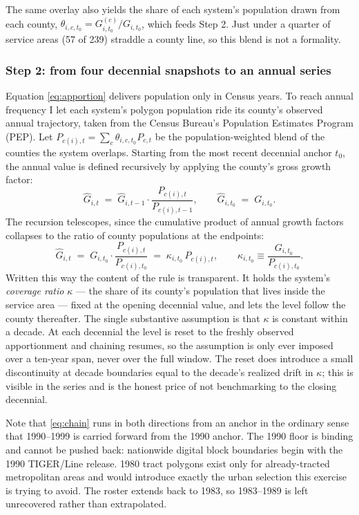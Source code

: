 The same overlay also yields the share of each system's population drawn from
each county,
$\theta_{i,c,t_0} = G_{i,t_0}^{(c)} / G_{i,t_0}$, which feeds Step 2. Just under a
quarter of service areas (57 of 239) straddle a county line, so this blend is not
a formality.

\subsubsection{Step 2: from four decennial snapshots to an annual series}

Equation \eqref{eq:apportion} delivers population only in Census years. To reach
annual frequency I let each system's polygon population ride its county's
observed annual trajectory, taken from the Census Bureau's Population Estimates
Program (PEP). Let $P_{c(i),t}=\sum_c \theta_{i,c,t_0} P_{c,t}$ be the
population-weighted blend of the counties the system overlaps. Starting from the
most recent decennial anchor $t_0$, the annual value is defined recursively by
applying the county's gross growth factor:
%
\begin{equation}
\hat G_{i,t} \;=\; \hat G_{i,t-1}\cdot\frac{P_{c(i),t}}{P_{c(i),t-1}},
\qquad
\hat G_{i,t_0} \;=\; G_{i,t_0} .
\label{eq:chain}
\end{equation}
%
The recursion telescopes, since the cumulative product of annual growth factors
collapses to the ratio of county populations at the endpoints:
%
\begin{equation}
\hat G_{i,t} \;=\; G_{i,t_0}\cdot\frac{P_{c(i),t}}{P_{c(i),t_0}}
  \;=\; \kappa_{i,t_0}\,P_{c(i),t},
\qquad
\kappa_{i,t_0} \equiv \frac{G_{i,t_0}}{P_{c(i),t_0}} .
\label{eq:chain-closed}
\end{equation}
%
Written this way the content of the rule is transparent. It holds the system's
\emph{coverage ratio} $\kappa$ --- the share of its county's population that
lives inside the service area --- fixed at the opening decennial value, and lets
the level follow the county thereafter. The single substantive assumption is that
$\kappa$ is constant within a decade. At each decennial the level is reset to the
freshly observed apportionment and chaining resumes, so the assumption is only
ever imposed over a ten-year span, never over the full window. The reset does
introduce a small discontinuity at decade boundaries equal to the decade's
realized drift in $\kappa$; this is visible in the series and is the honest price
of not benchmarking to the closing decennial.

Note that \eqref{eq:chain} runs in both directions from an anchor in the ordinary
sense that 1990--1999 is carried forward from the 1990 anchor. The 1990 floor is
binding and cannot be pushed back: nationwide digital block boundaries begin with
the 1990 TIGER/Line release. 1980 tract polygons exist only for already-tracted
metropolitan areas and would introduce exactly the urban selection this exercise
is trying to avoid. The roster extends back to 1983, so 1983--1989 is left
unrecovered rather than extrapolated.

